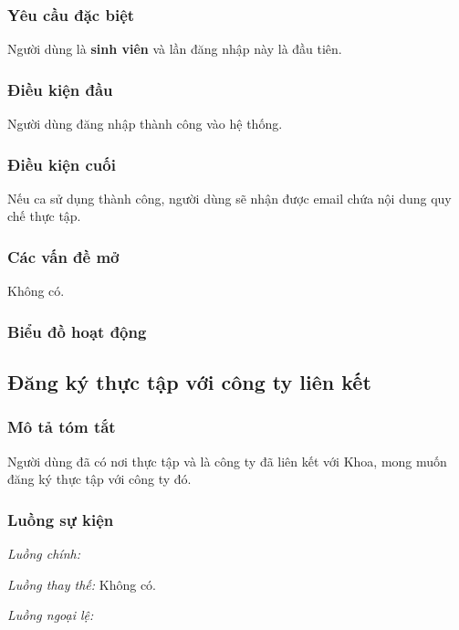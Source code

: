 \documentclass[./../main.tex]{subfiles}
\begin{document}
\subsubsection*{Yêu cầu đặc biệt}

Người dùng là \textbf{sinh viên} và lần đăng nhập này là đầu tiên.

\subsubsection*{Điều kiện đầu}

Người dùng đăng nhập thành công vào hệ thống.

\subsubsection*{Điều kiện cuối}

Nếu ca sử dụng thành công, người dùng sẽ nhận được email chứa nội dung
quy chế thực tập.

\subsubsection*{Các vấn đề mở}

Không có.

\subsubsection*{Biểu đồ hoạt động}

\subsection{Đăng ký thực tập với công ty liên kết}

\subsubsection*{Mô tả tóm tắt}

Người dùng đã có nơi thực tập và là công ty đã liên kết với Khoa, mong
muốn đăng ký thực tập với công ty đó.

\subsubsection*{Luồng sự kiện}

\emph{Luồng chính:}

\emph{Luồng thay thế:} Không có.

\emph{Luồng ngoại lệ:}
\end{document}
